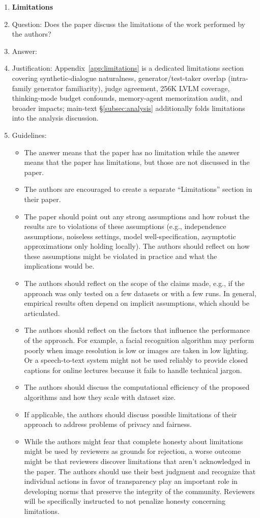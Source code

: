 \documentclass{article}
\begin{document}
\begin{enumerate}
\item {\bf Limitations}
    \item[] Question: Does the paper discuss the limitations of the work performed by the authors?
    \item[] Answer: \answerYes{}
    \item[] Justification: Appendix~\ref{app:limitations} is a dedicated limitations section covering synthetic-dialogue naturalness, generator/test-taker overlap (intra-family generator familiarity), judge agreement, 256K LVLM coverage, thinking-mode budget confounds, memory-agent memorization audit, and broader impacts; main-text \S\ref{subsec:analysis} additionally folds limitations into the analysis discussion.
    \item[] Guidelines:
    \begin{itemize}
        \item The answer \answerNA{} means that the paper has no limitation while the answer \answerNo{} means that the paper has limitations, but those are not discussed in the paper.
        \item The authors are encouraged to create a separate ``Limitations'' section in their paper.
        \item The paper should point out any strong assumptions and how robust the results are to violations of these assumptions (e.g., independence assumptions, noiseless settings, model well-specification, asymptotic approximations only holding locally). The authors should reflect on how these assumptions might be violated in practice and what the implications would be.
        \item The authors should reflect on the scope of the claims made, e.g., if the approach was only tested on a few datasets or with a few runs. In general, empirical results often depend on implicit assumptions, which should be articulated.
        \item The authors should reflect on the factors that influence the performance of the approach. For example, a facial recognition algorithm may perform poorly when image resolution is low or images are taken in low lighting. Or a speech-to-text system might not be used reliably to provide closed captions for online lectures because it fails to handle technical jargon.
        \item The authors should discuss the computational efficiency of the proposed algorithms and how they scale with dataset size.
        \item If applicable, the authors should discuss possible limitations of their approach to address problems of privacy and fairness.
        \item While the authors might fear that complete honesty about limitations might be used by reviewers as grounds for rejection, a worse outcome might be that reviewers discover limitations that aren't acknowledged in the paper. The authors should use their best judgment and recognize that individual actions in favor of transparency play an important role in developing norms that preserve the integrity of the community. Reviewers will be specifically instructed to not penalize honesty concerning limitations.
    \end{itemize}


\end{enumerate}
\end{document}
